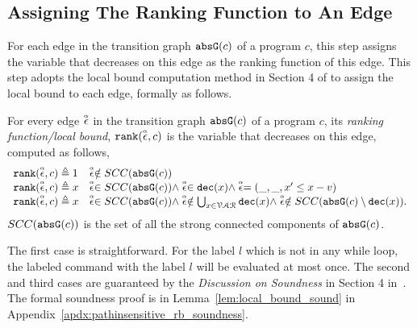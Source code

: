   \subsection{Assigning The Ranking Function to An Edge}
  For each edge in the transition graph $\mathtt{abs}{\mathtt{G}}(c)$ of a program $c$,
  this step assigns the variable that decreases on this edge as the ranking function   of this edge.
  This step adopts the local bound computation method in Section 4 of \cite{sinn2017complexity} to assign the local bound to each edge,
  formally as follows.
  \begin{defn}
    \label{def:ranking_gen}
  For every edge $\stackrel{\scriptscriptstyle{\alpha}}{\mathtt{\epsilon}{}}$ in the transition graph $\mathtt{abs}{\mathtt{G}}(c)$ of a program $c$,
  its \emph{ranking function/local bound}, $\mathtt{rank}(\stackrel{\scriptscriptstyle{\alpha}}{\mathtt{\epsilon}{}}, c)$
  is the variable that decreases on this edge, computed as follows,
  \[ 
  \begin{array}{ll}
    \mathtt{rank}(\stackrel{\scriptscriptstyle{\alpha}}{\mathtt{\epsilon}{}}, c) \triangleq 1 
    & \stackrel{\scriptscriptstyle{\alpha}}{\mathtt{\epsilon}{}} \notin SCC(\mathtt{abs}{\mathtt{G}}(c))
    \\
    \mathtt{rank}(\stackrel{\scriptscriptstyle{\alpha}}{\mathtt{\epsilon}{}}, c) \triangleq x
    & \stackrel{\scriptscriptstyle{\alpha}}{\mathtt{\epsilon}{}} \in SCC(\mathtt{abs}{\mathtt{G}}(c)) \land \stackrel{\scriptscriptstyle{\alpha}}{\mathtt{\epsilon}{}} \in \mathtt{dec}(x) \land  \stackrel{\scriptscriptstyle{\alpha}}{\mathtt{\epsilon}{}} = (\_, \_ , x' \leq x - v) \\
    \mathtt{rank}(\stackrel{\scriptscriptstyle{\alpha}}{\mathtt{\epsilon}{}}, c) \triangleq x
    & \stackrel{\scriptscriptstyle{\alpha}}{\mathtt{\epsilon}{}} \in SCC(\mathtt{abs}{\mathtt{G}}(c)) \land 
    \stackrel{\scriptscriptstyle{\alpha}}{\mathtt{\epsilon}{}}  \notin \bigcup_{x \in \mathcal{VAR}} \mathtt{dec}(x)
    \land \stackrel{\scriptscriptstyle{\alpha}}{\mathtt{\epsilon}{}} \notin SCC(\mathtt{abs}{\mathtt{G}}(c) \setminus \mathtt{dec}(x)).
  \end{array}
  \]
  $SCC(\mathtt{abs}{\mathtt{G}}(c))$ is the set of all the strong connected components of $\mathtt{abs}{\mathtt{G}}(c)$.
  \end{defn}
    The first case is straightforward. 
    For the label $l$ which is not in any while loop, 
    the labeled command with the label $l$ will be 
    evaluated at most once. 
    The second and third cases are guaranteed by the \emph{Discussion on Soundness} in Section 4 in~\cite{sinn2017complexity}.
    The formal soundness proof is in Lemma~\ref{lem:local_bound_sound} in Appendix~\ref{apdx:pathinsensitive_rb_soundness}.
